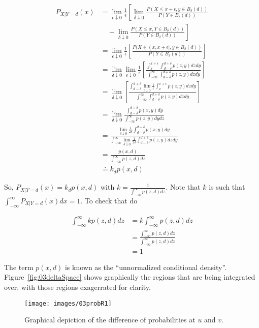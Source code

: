 \begin{align*}
P_{X|Y=d}(x) &= \lim_{\epsilon\downarrow 0}\frac{1}{\epsilon}\left[\lim_{\delta\downarrow 0} \frac{P(X\leq x+\epsilon, y\in B_\delta(d))}{P(Y\in B_\delta(d))} \right. \\
&\left.\quad - \lim_{\delta\downarrow 0} \frac{P(X\leq x, Y\in B_\delta(d))}{P(Y\in B_\delta(d))}\right] \\
&= \lim_{\epsilon\downarrow 0}\frac{1}{\epsilon}\left[ \frac{P(X\in(x,x+\epsilon],y\in B_\delta(d))}{P(Y\in B_\delta(d))}\right] \\%
&= \lim_{\delta\downarrow 0}\lim_{\epsilon\downarrow 0}\frac{1}{\epsilon} \left[ \frac{\int_x^{x+\epsilon} \int_{d-\delta}^{d+\delta} p(z,y)dzdy}{\int_{-\infty}^\infty \int_{d-\delta}^{d+\delta} p(z,y)dzdy}\right] \\
&= \lim_{\delta\downarrow 0}\left[ \frac{\int_{d-\delta}^{d+\delta}\lim_{\epsilon\downarrow 0} \frac{1}{\epsilon} \int_x^{x+\epsilon} p(z,y)dzdy}{\int_{-\infty}^\infty \int_{d-\delta}^{d+\delta} p(z,y)dzdy}\right] \\
&= \lim_{\delta\downarrow 0} \frac{\int_{d-\delta}^{d+\delta}p(x,y)dy}{\int_{-\infty}^\infty p(z,y)dydz} \\
&= \frac{\lim_{\delta\downarrow 0}\frac{1}{2\delta}\int_{d-\delta}^{d+\delta} p(x,y)dy}{\int_{-\infty}^\infty \lim_{\delta\downarrow 0}\frac{1}{2\delta}\int_{d-\delta}^{d+\delta} p(z,y)dzdy} \\
&= \frac{p(x,d)}{\int_{-\infty}^\infty p(z,d)dz} \\
&\doteq k_d p(x,d)
\end{align*}

So, $P_{X|Y=d}(x) = k_d p(x,d)$ with $k=\frac{1}{\int_{-\infty}^\infty p(z,d)dz}$.
Note that $k$ is such that $\int_{-\infty}^\infty P_{X|Y=d}(x)dx=1$.
To check that do

\begin{align*}
\int_{-\infty}^\infty kp(z,d)dz &= k\int_{-\infty}^\infty p(z,d)dz \\
&= \frac{\int_{-\infty}^\infty p(z,d)dz}{\int_{-\infty}^\infty p(z,d)dz} \\
&= 1
\end{align*}

The term $p(x,d)$ is known as the ``unnormalized conditional density''.
Figure~\ref{fig:03deltaSpace} shows graphically the regions that are being integrated over, with those regions exagerrated for clarity.

\begin{figure}[ht!]
\centering
\texttt{[image: images/03probR1]}
\caption{Graphical depiction of the difference of probabilities at $u$ and $v$.}%
\label{fig:03probR1}
\end{figure}

